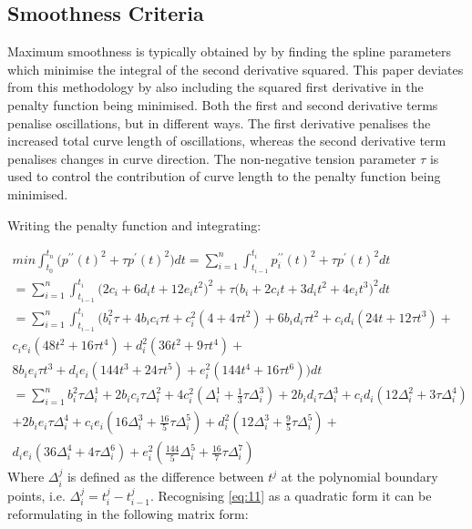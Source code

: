\documentclass{article}
\begin{document}
\subsection{Smoothness Criteria}
Maximum smoothness is typically obtained by by finding the spline 
parameters which minimise the integral of the second derivative squared. This paper deviates from
this methodology by also including the squared first derivative in the penalty function being
minimised. Both the first and second derivative terms penalise oscillations, but in different
ways. The first derivative penalises the increased total curve length of oscillations, whereas the second
derivative term penalises changes in curve direction. The non-negative tension parameter 
$\tau$ is used to control the contribution of curve length to the penalty function being minimised.

\bigskip

Writing the penalty function and integrating:

\begin{eqnarray}
    \label{eq:11}
    \nonumber
    min \int_{t_0}^{t_n} \bigl( p^{\prime\prime}(t)^2 + \tau p^{\prime}(t)^2 \bigr) dt 
    = \sum_{i=1}^{n}\int_{t_{i - 1}}^{t_i}p^{\prime\prime}_i(t)^2 + \tau p^{\prime}(t)^2 dt \\
    \nonumber
    =\sum_{i=1}^{n}\int_{t_{i - 1}}^{t_i} \bigl( 2 c_i + 6 d_i t + 12 e_i t^2\bigr)^2 
    + \tau \bigl( b_i + 2 c_i t + 3 d_i t^2 + 4 e_i t^3 \bigr)^2 dt \\
    \nonumber
    =\sum_{i=1}^{n}\int_{t_{i - 1}}^{t_i} \biggl( b_i^2\tau + 4 b_i c_i \tau t + c_i^2(4 + 4 \tau t^2) 
    + 6 b_i d_i \tau t^2 + c_i d_i (24 t + 12 \tau t^3) + \\
    \nonumber
    c_i e_i (48 t^2 + 16 \tau t^4) + d_i^2 (36 t^2 + 9 \tau t^4) + \\
    \nonumber
    8 b_i e_i \tau t^3 + d_i e_i (144 t^3 + 24 \tau t^5) + 
     e_i^2 (144 t^4 + 16 \tau t^6) \biggr) dt \\
    \nonumber
    =\sum_{i=1}^{n} b_i^2 \tau \Delta_i^1 + 2 b_i c_i \tau \Delta_i^2  + 4 c_i^2 (\Delta_i^1 + \frac{1}{3} \tau \Delta_i^3  ) 
    + 2 b_i d_i \tau \Delta_i^3 + c_i d_i (12 \Delta_i^2 + 3 \tau \Delta_i^4 ) \\
    \nonumber
    + 2 b_i e_i \tau \Delta_i^4 + c_i e_i ( 16 \Delta_i^3 + \frac{16}{5} \tau \Delta_i^5 ) + d_i^2 (12 \Delta_i^3 + 
    \frac{9}{5} \tau \Delta_i^5 ) + \\
    d_i e_i ( 36 \Delta_i^4 + 4 \tau \Delta_i^6 ) + 
    e_i^2 ( \frac{144}{5} \Delta_i^5 + \frac{16}{7} \tau \Delta_i^7 )
\end{eqnarray}
Where $\Delta_i^j$ is defined as the difference between $t^j$ at the polynomial boundary points, 
i.e. $\Delta_i^j = t_i^j - t_{i-1}^j$.
Recognising \ref{eq:11} as a quadratic form it can be reformulating in the following matrix form:
\end{document}
